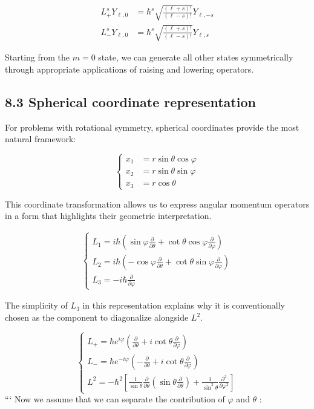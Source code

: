 \documentclass[italian]{HKNdocument}
\begin{document}
\begin{align*}
L_{+}^{s} Y_{\ell, 0} & =\hbar^{s} \sqrt{\frac{(\ell+s)!}{(\ell-s)!}} Y_{\ell,-s} \\
L_{-}^{s} Y_{\ell, 0} & =\hbar^{s} \sqrt{\frac{(\ell+s)!}{(\ell-s)!}} Y_{\ell, s} \tag{8.28}
\end{align*}

Starting from the $m=0$ state, we can generate all other states symmetrically through appropriate applications of raising and lowering operators.

\subsection*{8.3 Spherical coordinate representation}
For problems with rotational symmetry, spherical coordinates provide the most natural framework:

\[
\begin{cases}x_{1} & =r \sin \theta \cos \varphi  \tag{8.29}\\ x_{2} & =r \sin \theta \sin \varphi \\ x_{3} & =r \cos \theta\end{cases}
\]

This coordinate transformation allows us to express angular momentum operators in a form that highlights their geometric interpretation.

\begin{align}
\left\{\begin{array}{l}
L_{1} = i \hbar\left(\sin \varphi \frac{\partial}{\partial \theta}+\cot \theta \cos \varphi \frac{\partial}{\partial \varphi}\right)  \tag{8.30}\\
L_{2} = i \hbar\left(-\cos \varphi \frac{\partial}{\partial \theta}+\cot \theta \sin \varphi \frac{\partial}{\partial \varphi}\right) \\
L_{3} = -i \hbar \frac{\partial}{\partial \varphi}
\end{array}\right.
\end{align}

The simplicity of $L_3$ in this representation explains why it is conventionally chosen as the component to diagonalize alongside $L^2$.

\[
\left\{\begin{array}{l}
L_{+}=\hbar e^{i \varphi}\left(\frac{\partial}{\partial \theta}+i \cot \theta \frac{\partial}{\partial \varphi}\right)  \tag{8.31}\\
L_{-}=\hbar e^{-i \varphi}\left(-\frac{\partial}{\partial \theta}+i \cot \theta \frac{\partial}{\partial \varphi}\right) \\
L^{2}=-\hbar^{2}\left[\frac{1}{\sin \theta} \frac{\partial}{\partial \theta}\left(\sin \theta \frac{\partial}{\partial \theta}\right)+\frac{1}{\sin ^{2} \theta} \frac{\partial^{2}}{\partial \varphi^{2}}\right]
\end{array}\right.
\]
```
Now we assume that we can separate the contribution of $\varphi$ and $\theta$ :
\end{document}
